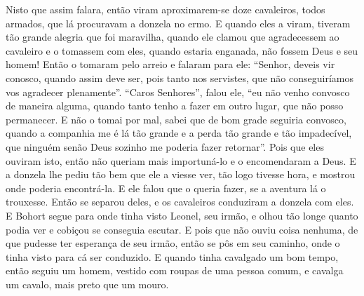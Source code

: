  Nisto que assim falara, então viram aproximarem-se doze cavaleiros, todos
armados, que lá procuravam a donzela no ermo. E quando eles a viram, tiveram
tão grande alegria que foi maravilha, quando ele clamou que agradecessem ao
cavaleiro e o tomassem com eles, quando estaria enganada, não fossem Deus e seu
homem! Então o tomaram pelo arreio e falaram para ele: “Senhor, deveis vir
conosco, quando assim deve ser, pois tanto nos servistes, que não
conseguiríamos vos agradecer plenamente”. “Caros Senhores”, falou ele, “eu não
venho convosco de maneira alguma, quando tanto tenho a fazer em outro lugar,
que não posso permanecer. E não o tomai por mal, sabei que de bom grade
seguiria convosco, quando a companhia me é lá tão grande e a perda tão grande e
tão impadecível, que ninguém senão Deus sozinho me poderia fazer retornar”.
Pois que eles ouviram isto, então não queriam mais importuná-lo e o
encomendaram a Deus. E a donzela lhe pediu tão bem que ele a
viesse ver, tão logo tivesse hora, e mostrou onde poderia encontrá-la. E ele
falou que o queria fazer, se a aventura lá o trouxesse. Então se separou deles,
e os cavaleiros conduziram  a donzela com eles. E Bohort segue para onde tinha
visto Leonel, seu irmão, e olhou tão longe quanto podia ver e cobiçou se
conseguia escutar. E pois que não ouviu coisa nenhuma, de que pudesse ter
esperança de seu irmão, então se pôs em seu caminho, onde o tinha visto para cá
ser conduzido. E quando tinha cavalgado um bom tempo, então seguiu um homem,
vestido com roupas de uma pessoa comum, e cavalga um cavalo, mais preto que um
mouro. 

